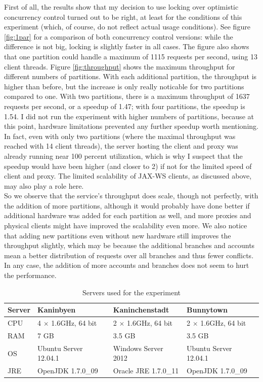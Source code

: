 \documentclass[12pt,a4paper,fleqn]{article}
\begin{document}
First of all, the results show that my decision to use locking over optimistic concurrency control turned out to be right, at least for the conditions of this experiment (which, of course, do not reflect actual usage conditions). See figure \ref{fig:1par} for a comparison of both concurrency control versions: while the difference is not big, locking is slightly faster in all cases. The figure also shows that one partition could handle a maximum of 1115 requests per second, using 13 client threads. Figure \ref{fig:throughput} shows the maximum throughput for different numbers of partitions. With each additional partition, the throughput is higher than before, but the increase is only really noticable for two partitions compared to one. With two partitions, there is a maximum throughput of 1637 requests per second, or a speedup of 1.47; with four partitions, the speedup is 1.54. I did not run the experiment with higher numbers of partitions, because at this point, hardware limitations prevented any further speedup worth mentioning. In fact, even with only two partitions (where the maximal throughput was reached with 14 client threads), the server hosting the client and proxy was already running near 100 percent utilization, which is why I suspect that the speedup would have been higher (and closer to 2) if not for the limited speed of client and proxy. The limited scalability of JAX-WS clients, as discussed above, may also play a role here. \\So we observe that the service's throughput does scale, though not perfectly, with the addition of more partitions, although it would probably have done better if additional hardware was added for each partition as well, and more proxies and physical clients might have improved the scalability even more. We also notice that adding new partitions even without new hardware still improves the throughput slightly, which may be because the additional branches and accounts mean a better distribution of requests over all branches and thus fewer conflicts. In any case, the addition of more accounts and branches does not seem to hurt the performance.

\begin{table}
\begin{tabular}{|l|l|l|l|}
\hline 
Server & Kaninbyen & Kaninchenstadt & Bunnytown \\ 
\hline 
CPU & 4 $\times$ 1.6GHz, 64 bit & 2 $\times$ 1.6GHz, 64 bit &  2 $\times$ 1.6GHz, 64 bit \\
\hline
RAM & 7 GB & 3.5 GB & 3.5 GB \\
\hline
OS & Ubuntu Server 12.04.1 & Windows Server 2012 & Ubuntu Server 12.04.1 \\
\hline 
JRE & OpenJDK 1.7.0\_09 & Oracle JRE 1.7.0\_11 & OpenJDK 1.7.0\_09 \\
\hline
\end{tabular} 
\caption{Servers used for the experiment}
\label{tab:setup}
\end{table}
\end{document}
